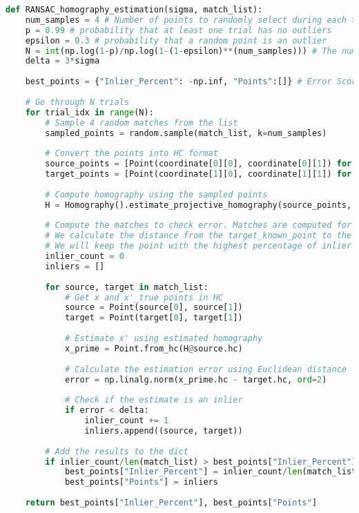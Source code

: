 \documentclass{article}
\begin{document}
\begin{lstlisting}[language=Python]
def RANSAC_homography_estimation(sigma, match_list):
    num_samples = 4 # Number of points to randomly select during each trial
    p = 0.99 # probability that at least one trial has no outliers
    epsilon = 0.3 # probability that a random point is an outlier
    N = int(np.log(1-p)/np.log(1-(1-epsilon)**(num_samples))) # The number of trials required,
    delta = 3*sigma
    
    best_points = {"Inlier_Percent": -np.inf, "Points":[]} # Error Score, [((x11,y11), (x21,y21)), ((x12, y12), (x22, y22)), ...]
    
    # Go through N trials
    for trial_idx in range(N):
        # Sample 4 random matches from the list
        sampled_points = random.sample(match_list, k=num_samples)
        
        # Convert the points into HC format
        source_points = [Point(coordinate[0][0], coordinate[0][1]) for coordinate in sampled_points]
        target_points = [Point(coordinate[1][0], coordinate[1][1]) for coordinate in sampled_points]
        
        # Compute homography using the sampled points
        H = Homography().estimate_projective_homography(source_points, target_points)
        
        # Compute the matches to check error. Matches are computed for all interest points
        # We calculate the distance from the target_known_point to the estimated x_prime point for all interest points
        # We will keep the point with the highest percentage of inlier points
        inlier_count = 0
        inliers = []
        
        for source, target in match_list:
            # Get x and x'_true points in HC
            source = Point(source[0], source[1])
            target = Point(target[0], target[1])
            
            # Estimate x' using estimated homography
            x_prime = Point.from_hc(H@source.hc)
            
            # Calculate the estimation error using Euclidean distance
            error = np.linalg.norm(x_prime.hc - target.hc, ord=2)
            
            # Check if the estimate is an inlier
            if error < delta: 
                inlier_count += 1
                inliers.append((source, target))
        
        # Add the results to the dict
        if inlier_count/len(match_list) > best_points["Inlier_Percent"]:
            best_points["Inlier_Percent"] = inlier_count/len(match_list)
            best_points["Points"] = inliers
    
    return best_points["Inlier_Percent"], best_points["Points"]
\end{lstlisting}
\end{document}
